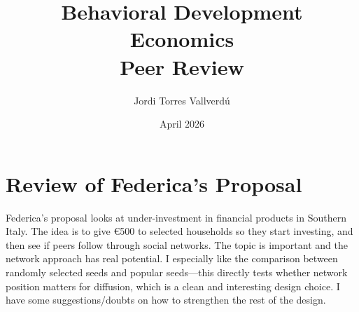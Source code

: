\documentclass[11pt,a4paper]{article}
\title{\textbf{Behavioral Development Economics}\\[0.3em] Peer Review}
\author{Jordi Torres Vallverd\'{u}}
\date{April 2026}
\begin{document}
\maketitle

\section*{Review of Federica's Proposal}

Federica's proposal looks at under-investment in financial products in Southern Italy. The idea is to give \euro{500} to selected households so they start investing, and then see if peers follow through social networks. The topic is important and the network approach has real potential. I especially like the comparison between randomly selected seeds and popular seeds---this directly tests whether network position matters for diffusion, which is a clean and interesting design choice. I have some suggestions/doubts on how to strengthen the rest of the design.
\end{document}

